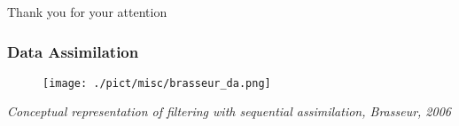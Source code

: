 \documentclass[compress,slidescentered,notes=hide]{beamer}
\newcommand{\legende}[1]{\textit{\footnotesize #1}}
\begin{document}
%
\begin{frame}
\begin{center}
Thank you for your attention 
\end{center}
\end{frame}
%
\begin{frame}
  \frametitle{Data Assimilation}
  \begin{figure}
    \texttt{[image: ./pict/misc/brasseur\_da.png]}
  \end{figure}
  \legende{Conceptual representation of filtering with sequential assimilation, Brasseur, 2006}
  
\end{frame}
%

 
\end{document}
